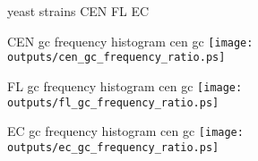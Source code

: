 \documentclass{beamer}
\begin{document}
\begin{frame} {yeast strains}
    CEN
    FL
    EC
\end{frame}

\begin{frame} {CEN gc frequency histogram}
    cen gc
    \texttt{[image: outputs/cen\_gc\_frequency\_ratio.ps]}
\end{frame}

\begin{frame} {FL gc frequency histogram}
    cen gc
    \texttt{[image: outputs/fl\_gc\_frequency\_ratio.ps]}
\end{frame}

\begin{frame} {EC gc frequency histogram}
    cen gc
    \texttt{[image: outputs/ec\_gc\_frequency\_ratio.ps]}
\end{frame}
\end{document}

